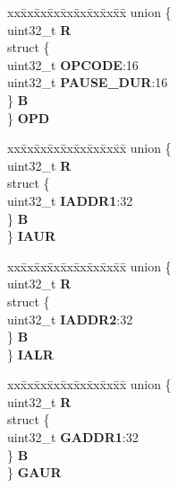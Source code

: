 \begin{DoxyCompactItemize}
\begin{tabbing}
\end{tabbing}\item 
\mbox{\label{structFEC__tag_a4e114934b1621a0eda7444649d5f2c51}} 
\begin{tabbing}
xx\=xx\=xx\=xx\=xx\=xx\=xx\=xx\=xx\=\kill
union \{\\
\>uint32\_t {\bfseries R}\\
\>struct \{\\
\>\>uint32\_t {\bfseries OPCODE}:16\\
\>\>uint32\_t {\bfseries PAUSE\_DUR}:16\\
\>\} {\bfseries B}\\
\} {\bfseries OPD}\\

\end{tabbing}\item 
\mbox{\label{structFEC__tag_a9ac88e3cd263cec4cf2582b03263fb16}} 
\begin{tabbing}
xx\=xx\=xx\=xx\=xx\=xx\=xx\=xx\=xx\=\kill
union \{\\
\>uint32\_t {\bfseries R}\\
\>struct \{\\
\>\>uint32\_t {\bfseries IADDR1}:32\\
\>\} {\bfseries B}\\
\} {\bfseries IAUR}\\

\end{tabbing}\item 
\mbox{\label{structFEC__tag_a4dc78b2450f6e9962b72a01dda52b4c1}} 
\begin{tabbing}
xx\=xx\=xx\=xx\=xx\=xx\=xx\=xx\=xx\=\kill
union \{\\
\>uint32\_t {\bfseries R}\\
\>struct \{\\
\>\>uint32\_t {\bfseries IADDR2}:32\\
\>\} {\bfseries B}\\
\} {\bfseries IALR}\\

\end{tabbing}\item 
\mbox{\label{structFEC__tag_adbbba5f3540a1527c1d7f17641c9915f}} 
\begin{tabbing}
xx\=xx\=xx\=xx\=xx\=xx\=xx\=xx\=xx\=\kill
union \{\\
\>uint32\_t {\bfseries R}\\
\>struct \{\\
\>\>uint32\_t {\bfseries GADDR1}:32\\
\>\} {\bfseries B}\\
\} {\bfseries GAUR}\\


\end{tabbing}
\end{DoxyCompactItemize}
